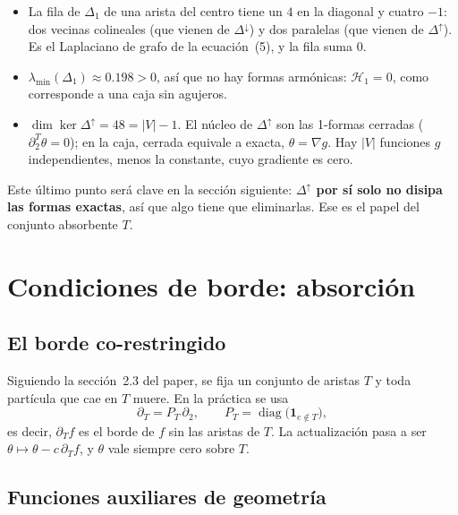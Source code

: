 \documentclass[11pt,a4paper]{article}
\theoremstyle{plain}
\theoremstyle{remark}
\DeclareMathOperator{\diag}{diag}
\begin{document}
\begin{itemize}
  \item La fila de $\Delta_1$ de una arista del centro tiene un $4$ en la diagonal y cuatro $-1$: dos vecinas colineales (que vienen de $\Delta^{\downarrow}$) y dos paralelas (que vienen de $\Delta^{\uparrow}$). Es el Laplaciano de grafo de la ecuación~(5), y la fila suma $0$.
  \item $\lambda_{\min}(\Delta_1)\approx0.198>0$, así que no hay formas armónicas: $\mathcal{H}_1=0$, como corresponde a una caja sin agujeros.
  \item $\dim\ker\Delta^{\uparrow}=48=|V|-1$. El núcleo de $\Delta^{\uparrow}$ son las 1-formas cerradas ($\partial_2^T\theta=0$); en la caja, cerrada equivale a exacta, $\theta=\nabla g$. Hay $|V|$ funciones $g$ independientes, menos la constante, cuyo gradiente es cero.
\end{itemize}

Este último punto será clave en la sección siguiente: \textbf{$\Delta^{\uparrow}$ por sí solo no disipa las formas exactas}, así que algo tiene que eliminarlas. Ese es el papel del conjunto absorbente $T$.

\section{Condiciones de borde: absorción}

\subsection{El borde co-restringido}

Siguiendo la sección~2.3 del paper, se fija un conjunto de aristas $T$ y toda partícula que cae en $T$ muere. En la práctica se usa
\[
\partial_T=P_T\,\partial_2,\qquad P_T=\diag\big(\mathbf 1_{e\notin T}\big),
\]
es decir, $\partial_T f$ es el borde de $f$ sin las aristas de $T$. La actualización pasa a ser $\theta\mapsto\theta-c\,\partial_Tf$, y $\theta$ vale siempre cero sobre $T$.

\subsection{Funciones auxiliares de geometría}
\end{document}
